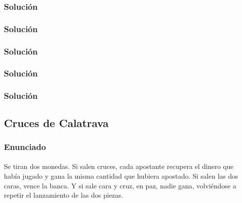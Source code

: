   \begin{frame}
   \frametitle{Solución}

   \begin{codepass}
    
   \end{codepass}

  \end{frame}

  \begin{frame}
   \frametitle{Solución}

   \begin{testfail}
    
   \end{testfail}

  \end{frame}

  \begin{frame}
   \frametitle{Solución}

   \begin{codepass}
    
   \end{codepass}

  \end{frame}

  \begin{frame}
   \frametitle{Solución}

   \begin{testfail}
    
   \end{testfail}

  \end{frame}

  \begin{frame}
   \frametitle{Solución}

   \begin{codepass}
    
   \end{codepass}

  \end{frame}


  \subsection{Cruces de Calatrava}

  \begin{frame}
   \frametitle{Enunciado}
   \framesubtitle{}

   Se tiran dos monedas. Si salen cruces, cada apostante recupera el
   dinero que había jugado y gana la misma cantidad que hubiera
   apostado.  Si salen las dos caras, vence la banca.  Y si sale cara y
   cruz, en paz, nadie gana, volviéndose a repetir el lanzamiento de las
   dos piezas.


  \end{frame}
